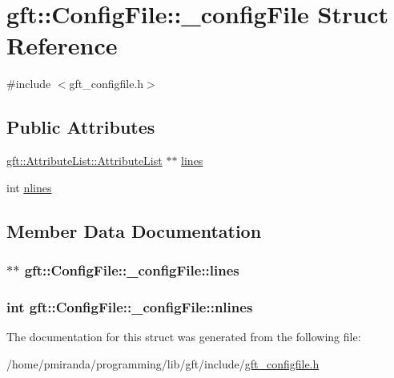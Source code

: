 \hypertarget{structgft_1_1ConfigFile_1_1__configFile}{}\section{gft\+:\+:Config\+File\+:\+:\+\_\+config\+File Struct Reference}
\label{structgft_1_1ConfigFile_1_1__configFile}


{\ttfamily \#include $<$gft\+\_\+configfile.\+h$>$}

\subsection*{Public Attributes}
\begin{DoxyCompactItemize}
\item 
\hyperlink{namespacegft_1_1AttributeList_af787bfbf6b7ca4c2ebafac69a377d47b}{gft\+::\+Attribute\+List\+::\+Attribute\+List} $\ast$$\ast$ \hyperlink{structgft_1_1ConfigFile_1_1__configFile_a21b828b8190c04e2176e3fb889ddf41e}{lines}
\item 
int \hyperlink{structgft_1_1ConfigFile_1_1__configFile_ac8e1d504280f6f41353ea041192f7f44}{nlines}
\end{DoxyCompactItemize}


\subsection{Member Data Documentation}
\subsubsection[{\texorpdfstring{lines}{lines}}]{$\ast$$\ast$ gft\+::\+Config\+File\+::\+\_\+config\+File\+::lines}\hypertarget{structgft_1_1ConfigFile_1_1__configFile_a21b828b8190c04e2176e3fb889ddf41e}{}\label{structgft_1_1ConfigFile_1_1__configFile_a21b828b8190c04e2176e3fb889ddf41e}
\subsubsection[{\texorpdfstring{nlines}{nlines}}]{\setlength{\rightskip}{0pt plus 5cm}int gft\+::\+Config\+File\+::\+\_\+config\+File\+::nlines}\hypertarget{structgft_1_1ConfigFile_1_1__configFile_ac8e1d504280f6f41353ea041192f7f44}{}\label{structgft_1_1ConfigFile_1_1__configFile_ac8e1d504280f6f41353ea041192f7f44}


The documentation for this struct was generated from the following file\+:\begin{DoxyCompactItemize}
\item 
/home/pmiranda/programming/lib/gft/include/\hyperlink{gft__configfile_8h}{gft\+\_\+configfile.\+h}\end{DoxyCompactItemize}
